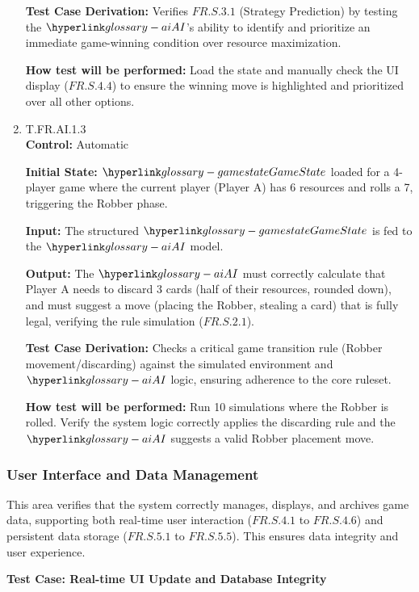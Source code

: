 \documentclass[12pt, titlepage]{article}
\begin{document}
\begin{enumerate}
\textbf{Test Case Derivation:} Verifies $\hyperref[FR.S.3.1]{FR.S.3.1}$ (Strategy Prediction) by testing the $\AI{}$'s ability to identify and prioritize an immediate game-winning condition over resource maximization.

\textbf{How test will be performed:} Load the state and manually check the UI display ($\hyperref[FR.S.4.4]{FR.S.4.4}$) to ensure the winning move is highlighted and prioritized over all other options.

\item{T.FR.AI.1.3\\}
\textbf{Control:} Automatic

\textbf{Initial State:} $\GameState{}$ loaded for a 4-player game where the current player (Player A) has 6 resources and rolls a 7, triggering the Robber phase.

\textbf{Input:} The structured $\GameState{}$ is fed to the $\AI{}$ model.

\textbf{Output:} The $\AI{}$ must correctly calculate that Player A needs to discard 3 cards (half of their resources, rounded down), and must suggest a move (placing the Robber, stealing a card) that is fully legal, verifying the rule simulation ($\hyperref[FR.S.2.1]{FR.S.2.1}$).

\textbf{Test Case Derivation:} Checks a critical game transition rule (Robber movement/discarding) against the simulated environment and $\AI{}$ logic, ensuring adherence to the core ruleset.

\textbf{How test will be performed:} Run 10 simulations where the Robber is rolled. Verify the system logic correctly applies the discarding rule and the $\AI{}$ suggests a valid Robber placement move.
\end{enumerate}

\subsubsection{User Interface and Data Management}

This area verifies that the system correctly manages, displays, and archives game data, supporting both real-time user interaction ($\hyperref[FR.S.4.1]{FR.S.4.1}$ to $\hyperref[FR.S.4.6]{FR.S.4.6}$) and persistent data storage ($\hyperref[FR.S.5.1]{FR.S.5.1}$ to $\hyperref[FR.S.5.5]{FR.S.5.5}$). This ensures data integrity and user experience.

\textbf{Test Case: Real-time UI Update and Database Integrity}
\end{document}
